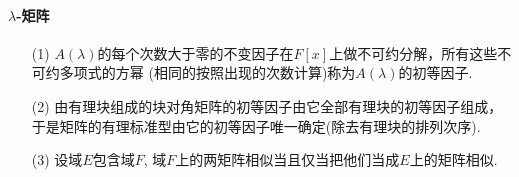 \paragraph{$\lambda$-矩阵}
\begin{itemize}
    \item[(1)] 
     $A(\lambda)$的每个次数大于零的不变因子在$F[x]$上做不可约分解，所有这些不可约多项式的方幂
     (相同的按照出现的次数计算)称为$A(\lambda)$的初等因子.
    \item[(2)] 由有理块组成的块对角矩阵的初等因子由它全部有理块的初等因子组成，
    于是矩阵的有理标准型由它的初等因子唯一确定(除去有理块的排列次序).  
    \item[(3)] 设域$E$包含域$F$, 域$F$上的两矩阵相似当且仅当把他们当成$E$上的矩阵相似. 
\end{itemize}

